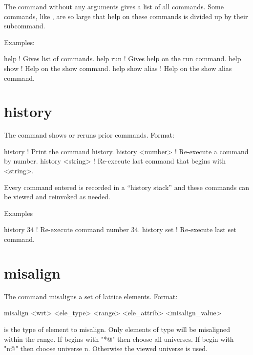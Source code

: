 The  command without any arguments gives a list of all commands.
Some commands, like , are so large that help on these commands
is divided up by their subcommand.

Examples:
\begin{example}
  help            ! Gives list of commands.
  help run        ! Gives help on the run command.
  help show       ! Help on the show command.
  help show alias ! Help on the show alias command.
\end{example}

\section{history}
\label{s:history}

The  command shows or reruns prior commands.  Format:
\begin{example}
  history           ! Print the command history.
  history <number>  ! Re-execute a command by number.
  history <string>  ! Re-execute last command that begins with <string>.
\end{example}

\vskip 0.2in
Every \tao command entered is recorded in a ``history stack'' and
these commands can be viewed and reinvoked as needed. 

Examples
\begin{example}
  history 34   ! Re-execute command number 34.
  history set  ! Re-execute last set command.  
\end{example}

\section{misalign}
\label{s:misalign}

The  command misaligns a set of lattice elements. Format:
\begin{example}
   misalign <wrt> <ele_type> <range> <ele_attrib> <misalign_value>
\end{example}

\vskip 0.2in 

 is the type of element to misalign.  Only
elements of type  will be misaligned within the range.
If  begins with "*@" then choose all universes. If
 begin with "n@" then choose universe n. Otherwise the
viewed universe is used.

